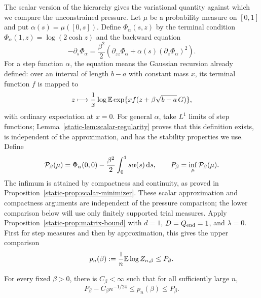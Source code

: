 The scalar version of the hierarchy gives the variational quantity
against which we compare the unconstrained pressure. Let $\mu$ be a
probability measure on $[0,1]$ and put $\alpha(s)=\mu([0,s])$.
Define $\Phi_\alpha(s,z)$ by the terminal condition
$\Phi_\alpha(1,z)=\log(2\cosh z)$ and the backward equation
\begin{equation}\label{static-eq:scalar-pde}
 -\partial_s\Phi_\alpha
 =\frac{\beta^2}{2}
       \left(\partial_{zz}\Phi_\alpha
                    +\alpha(s)(\partial_z\Phi_\alpha)^2\right).
\end{equation}
For a step function $\alpha$, the equation means the Gaussian
recursion already defined: over an interval of length $b-a$ with
constant mass $x$, its terminal function $f$ is mapped to
\[
 z\longmapsto\frac1x\log\mathbb E
       \exp\{x f(z+\beta\sqrt{b-a}\,G)\},
\]
with ordinary expectation at $x=0$. For general $\alpha$, take
$L^1$ limits of step functions; Lemma~\ref{static-lem:scalar-regularity}
proves that this definition exists, is independent of the approximation,
and has the stability properties we use. Define
\begin{equation}\label{static-eq:scalar-functional}
 \mathcal P_\beta(\mu)=\Phi_\alpha(0,0)
                   -\frac{\beta^2}{2}\int_0^1s\alpha(s)\,\mathrm d s,
 \qquad P_\beta=\inf_\mu\mathcal P_\beta(\mu).
\end{equation}
The infimum is attained by compactness and continuity, as proved in
Proposition~\ref{static-prop:scalar-minimizer}. These scalar approximation
and compactness arguments are independent of the pressure comparison;
the lower comparison below will use only finitely supported trial measures. Apply
Proposition~\ref{static-prop:matrix-bound} with $d=1$,
$D=Q_{\rm end}=1$, and $\lambda=0$. First for step measures and
then by approximation, this gives the upper comparison
\begin{equation}\label{static-eq:scalar-upper-bound}
 p_n(\beta):=\frac1n\mathbb E\log Z_{n,\beta}\le P_\beta.
\end{equation}

\begin{theorem}\label{static-thm:finite-size}
For every fixed $\beta>0$, there is $C_\beta<\infty$ such that for all
sufficiently large $n$,
\begin{equation}\label{static-eq:finite-size}
 P_\beta-C_\beta n^{-1/24}\le p_n(\beta)\le P_\beta.
\end{equation}
\end{theorem}

